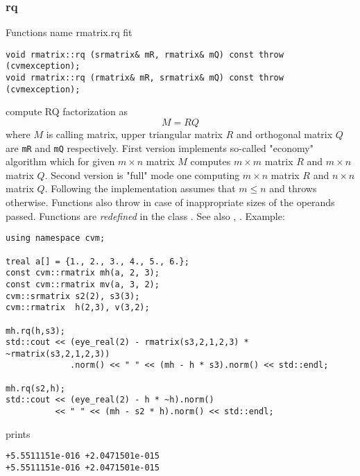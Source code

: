 \subsubsection{rq}
Functions%
\pdfdest name {rmatrix.rq} fit
\begin{verbatim}
void rmatrix::rq (srmatrix& mR, rmatrix& mQ) const throw (cvmexception);
void rmatrix::rq (rmatrix& mR, srmatrix& mQ) const throw (cvmexception);
\end{verbatim}
compute RQ factorization as
\begin{equation*}
M=RQ
\end{equation*}
where 
$M$ is  calling matrix, upper triangular matrix $R$
and orthogonal matrix $Q$ are \verb"mR" and \verb"mQ"
respectively. First version implements so-called "economy" algorithm
which for  given $m\times n$ matrix $M$ computes $m\times m$ matrix $R$
and $m\times n$ matrix $Q$. Second version is  "full" mode one
computing $m\times n$ matrix $R$ and $n\times n$ matrix $Q$.
Following 
the implementation assumes that $m\le n$ and throws 
otherwise.
Functions also throw
in case of inappropriate sizes of the operands passed.
Functions are \emph{redefined} in the class
.
See also ,
.
Example:
\begin{Verbatim}
using namespace cvm;

treal a[] = {1., 2., 3., 4., 5., 6.};
const cvm::rmatrix mh(a, 2, 3);
const cvm::rmatrix mv(a, 3, 2);
cvm::srmatrix s2(2), s3(3);
cvm::rmatrix  h(2,3), v(3,2);

mh.rq(h,s3);
std::cout << (eye_real(2) - rmatrix(s3,2,1,2,3) * ~rmatrix(s3,2,1,2,3))
             .norm() << " " << (mh - h * s3).norm() << std::endl;

mh.rq(s2,h);
std::cout << (eye_real(2) - h * ~h).norm()
          << " " << (mh - s2 * h).norm() << std::endl;
\end{Verbatim}
prints
\begin{Verbatim}
+5.5511151e-016 +2.0471501e-015
+5.5511151e-016 +2.0471501e-015
\end{Verbatim}
\newpage



